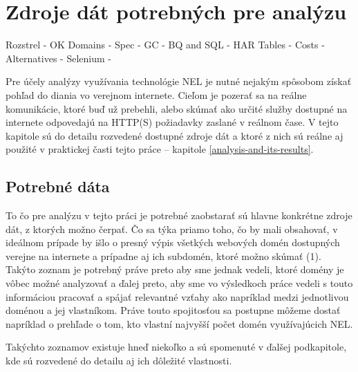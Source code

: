 \chapter{Zdroje dát potrebných pre analýzu}
\label{data-sources-available-for-research}

Rozstrel - OK
Domains  -
Spec     - 
GC       -
BQ and SQL     -
HAR Tables   -
Costs        -
Alternatives -
Selenium     - 


Pre účely analýzy využívania technológie NEL je nutné nejakým spôsobom získať pohľad do diania vo verejnom internete.
Cieľom je pozerať sa na reálne komunikácie, ktoré buď už prebehli, alebo skúmať ako určité služby dostupné na internete
odpovedajú na HTTP(S) požiadavky zaslané v reálnom čase. V tejto kapitole sú do detailu rozvedené dostupné zdroje dát 
a ktoré z nich sú reálne aj použité v praktickej časti tejto práce -- kapitole \ref{analysis-and-its-results}.

\section{Potrebné dáta}

To čo pre analýzu v tejto práci je potrebné zaobstarať sú hlavne konkrétne zdroje dát, z ktorých možno čerpať. Čo sa týka priamo toho,
čo by mali obsahovať, v ideálnom prípade by išlo o presný výpis všetkých webových domén dostupných verejne na internete 
a prípadne aj ich subdomén, ktoré možno skúmať (1). Takýto zoznam je potrebný práve preto aby sme jednak vedeli, ktoré domény
je vôbec možné analyzovať a ďalej preto, aby sme vo výsledkoch práce vedeli s touto informáciou pracovať a spájať 
relevantné vzťahy ako napríklad medzi jednotlivou doménou a jej vlastníkom. Práve touto spojitosťou sa postupne môžeme dostať napríklad 
o prehľade o tom, kto vlastní najvyšší počet domén využívajúcich NEL. 

Takýchto zoznamov existuje hneď niekoľko a sú spomenuté v ďalšej podkapitole, kde sú rozvedené do detailu aj ich dôležité vlastnosti.

